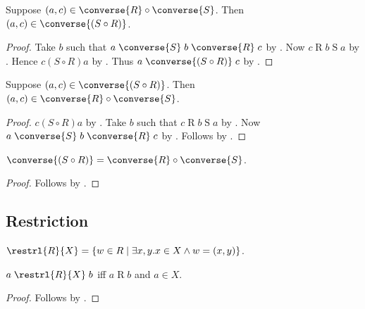 \begin{proposition}\label{circ_converse_intro_tuple}
    Suppose $(a, c) \in\converse{R}\circ\converse{S}$.
    Then $(a,c)\in \converse{(S\circ R)}$.
\end{proposition}
\begin{proof}
    Take $b$ such that $a\mathrel{\converse{S}} b\mathrel{\converse{R}} c$
        by .
    Now $c\mathrel{R}b\mathrel{S} a$ by .
    Hence $c\mathrel{(S\circ R)} a$ by .
    Thus $a\mathrel{\converse{(S\circ R)}} c$ by .
\end{proof}

\begin{proposition}\label{circ_converse_elim}
    Suppose $(a,c)\in \converse{(S\circ R)}$.
    Then $(a, c) \in\converse{R}\circ\converse{S}$.
\end{proposition}
\begin{proof}
    $c\mathrel{(S\circ R)} a$ by .
    Take $b$ such that $c\mathrel{R}b\mathrel{S} a$ by .
    Now $a\mathrel{\converse{S}} b\mathrel{\converse{R}} c$
        by .
    Follows by .
\end{proof}

\begin{proposition}\label{circ_converse}
    $\converse{(S\circ R)} = \converse{R}\circ\converse{S}$.
\end{proposition}
\begin{proof}
    Follows by .
\end{proof}

\subsection{Restriction}

\begin{definition}%
\label{restrl}
    $\restrl{R}{X} = \{ w\in R \mid \exists x, y. x\in X \land w = (x, y) \}$.
\end{definition}

\begin{proposition}\label{restrl_iff}
    $a \mathrel{\restrl{R}{X}} b$ iff $a\mathrel{R}b$ and $a\in X$.
\end{proposition}
\begin{proof}
    Follows by .
\end{proof}

